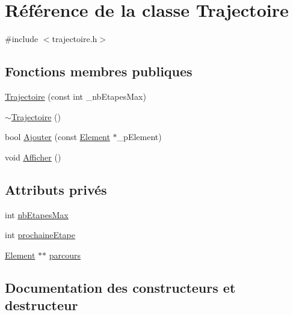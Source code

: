 \hypertarget{class_trajectoire}{}\section{Référence de la classe Trajectoire}
\label{class_trajectoire}


{\ttfamily \#include $<$trajectoire.\+h$>$}

\subsection*{Fonctions membres publiques}
\begin{DoxyCompactItemize}
\item 
\hyperlink{class_trajectoire_a0703f0b87651b76f1e8744c9a3872205}{Trajectoire} (const int \+\_\+nb\+Etapes\+Max)
\item 
\hyperlink{class_trajectoire_a9249a7bd01726684494eeea9fde54b9e}{$\sim$\+Trajectoire} ()
\item 
bool \hyperlink{class_trajectoire_a12ae44f39805bb480c2f8bf3454ea342}{Ajouter} (const \hyperlink{class_element}{Element} $\ast$\+\_\+p\+Element)
\item 
void \hyperlink{class_trajectoire_ab2ab026cbcf416f397ff6ee7f8331cc4}{Afficher} ()
\end{DoxyCompactItemize}
\subsection*{Attributs privés}
\begin{DoxyCompactItemize}
\item 
int \hyperlink{class_trajectoire_a62cc9d5c52215094c7f0731e07cccbf5}{nb\+Etapes\+Max}
\item 
int \hyperlink{class_trajectoire_a56fb38e337100dcbc3c49727d8f68c6a}{prochaine\+Etape}
\item 
\hyperlink{class_element}{Element} $\ast$$\ast$ \hyperlink{class_trajectoire_a526de5df82ef3ae78757ecb441d4179e}{parcours}
\end{DoxyCompactItemize}


\subsection{Documentation des constructeurs et destructeur}
\mbox{\label{class_trajectoire_a0703f0b87651b76f1e8744c9a3872205}} 
